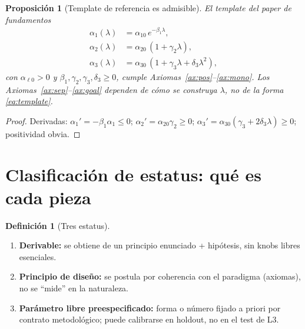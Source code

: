 \documentclass[11pt,a4paper]{article}
\theoremstyle{definition}
\newtheorem{definition}{Definici\'on}[section]
\theoremstyle{plain}
\newtheorem{proposition}{Proposici\'on}[section]
\theoremstyle{remark}
\begin{document}
\begin{proposition}[Template de referencia es admisible]
\label{prop:template}
El template del paper de fundamentos
\begin{equation}
\label{eq:template}
\begin{aligned}
\alpha_1(\lambda)&=\alpha_{10}\,e^{-\beta_1\lambda},\\
\alpha_2(\lambda)&=\alpha_{20}\,(1+\gamma_2\lambda),\\
\alpha_3(\lambda)&=\alpha_{30}\,(1+\gamma_3\lambda+\delta_3\lambda^2),
\end{aligned}
\end{equation}
con $\alpha_{\ell 0}>0$ y $\beta_1,\gamma_2,\gamma_3,\delta_3\ge 0$,
cumple Axiomas~\ref{ax:pos}--\ref{ax:mono}. Los Axiomas~\ref{ax:sep}--\ref{ax:goal}
dependen de c\'omo se construya $\lambda$, no de la forma \eqref{eq:template}.
\end{proposition}

\begin{proof}
Derivadas: $\alpha_1'=-\beta_1\alpha_1\le 0$;
$\alpha_2'=\alpha_{20}\gamma_2\ge 0$;
$\alpha_3'=\alpha_{30}(\gamma_3+2\delta_3\lambda)\ge 0$; positividad
obvia.
\end{proof}

\section{Clasificaci\'on de estatus: qu\'e es cada pieza}
\label{sec:status}

\begin{definition}[Tres estatus]
\label{def:status}
\begin{enumerate}[label=(\roman*)]
  \item \textbf{Derivable:} se obtiene de un principio enunciado +
  hip\'otesis, sin knobs libres esenciales.
  \item \textbf{Principio de dise\~no:} se postula por coherencia con el
  paradigma (axiomas), no se ``mide'' en la naturaleza.
  \item \textbf{Par\'ametro libre preespecificado:} forma o n\'umero fijado
  a priori por contrato metodológico; puede calibrarse en holdout, no en
  el test de L3.
\end{enumerate}
\end{definition}
\end{document}
